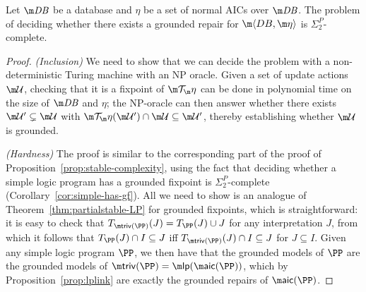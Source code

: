 \begin{proposition}
  \label{prop:grounded-complexity}
  Let $\db$ be a database and $\eta$ be a set of normal AICs over $\db$.
  The problem of deciding whether there exists a  grounded repair for $\fulldb$ is $\Sigma^P_2$-complete.
\end{proposition}
\begin{proof}
  \emph{(Inclusion)} We need to show that we can decide the problem with a non-deterministic Turing machine with an NP oracle.
  Given a set of update actions $\UU$, checking that it is a fixpoint of $\Op$ can be done in polynomial time on the size of $\db$ and $\eta$; the NP-oracle can then answer whether there exists $\UU'\subsetneq\UU$ with $\Op(\UU')\cap\UU\subseteq\UU'$, thereby establishing whether $\UU$ is grounded.

  \emph{(Hardness)}
  The proof is similar to the corresponding part of the proof of Proposition~\ref{prop:stable-complexity}, using the fact that deciding whether a simple logic program has a grounded fixpoint is $\Sigma^P_2$-complete (Corollary~\ref{cor:simple-has-gf}).
  All we need to show is an analogue of Theorem~\ref{thm:partialstable-LP} for grounded fixpoints, which is straightforward: it is easy to check that $T_{\triv(\PP)}(J)=T_\PP(J)\cup J$ for any interpretation $J$, from which it follows that $T_\PP(J)\cap I\subseteq J$ iff $T_{\triv(\PP)}(J)\cap I\subseteq J$ for $J\subseteq I$.
  Given any simple logic program $\PP$, we then have that the grounded models of $\PP$ are the grounded models of $\triv(\PP)=\lpop(\aicop(\PP))$, which by Proposition~\ref{prop:lplink} are exactly the grounded repairs of $\aicop(\PP)$.
\end{proof}


